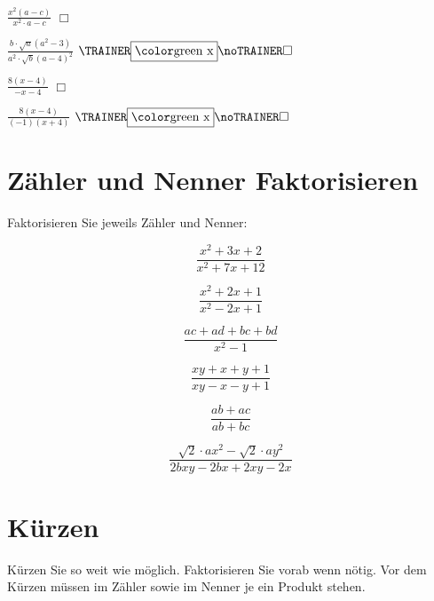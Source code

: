 {\begin{bbwAufgabenBlock}
\item $\frac{x^2(a-c)}{x^2\cdot{}a -c}$ $\Box{}$ 

\item $\frac{b\cdot{}\sqrt{a}(a^2-3)}{a^2\cdot{}\sqrt{b}(a-4)^2}$ $\BoxTT$ 

\item $\frac{8(x-4)}{-x-4}$ $\Box{}$ 

\item $\frac{8(x-4)}{(-1)(x+4)}$ $\BoxTT$ 


\end{bbwAufgabenBlock}
\newpage
\section{Zähler und Nenner Faktorisieren}
Faktorisieren Sie jeweils Zähler und Nenner:

\begin{bbwAufgabenBlock}
\item $$\frac{x^2+3x+2}{x^2+7x+12}$$

\item $$\frac{x^2+2x+1}{x^2-2x+1}$$

\item $$\frac{ac+ad+bc+bd}{x^2-1}$$

\item $$\frac{xy+x+y+1}{xy-x-y+1}$$

\item $$\frac{ab+ac}{ab+bc}$$

\item $$\frac{\sqrt{2}\cdot{}ax^2-\sqrt{2}\cdot{}ay^2}{2bxy-2bx+2xy-2x}$$


\end{bbwAufgabenBlock}
\newpage
\section{Kürzen}
Kürzen Sie so weit wie möglich. Faktorisieren Sie vorab wenn nötig.
Vor dem Kürzen müssen im Zähler sowie im Nenner je ein Produkt stehen.

}
